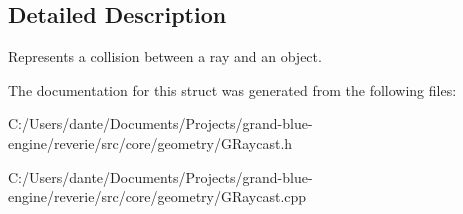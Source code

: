 \subsection{Detailed Description}
Represents a collision between a ray and an object. 

The documentation for this struct was generated from the following files\+:\begin{DoxyCompactItemize}
\item 
C\+:/\+Users/dante/\+Documents/\+Projects/grand-\/blue-\/engine/reverie/src/core/geometry/G\+Raycast.\+h\item 
C\+:/\+Users/dante/\+Documents/\+Projects/grand-\/blue-\/engine/reverie/src/core/geometry/G\+Raycast.\+cpp\end{DoxyCompactItemize}
